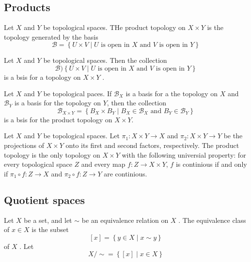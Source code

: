 \documentclass{article}
\theoremstyle{remark}
\begin{document}
\subsection{Products}%
\label{sub:products}

\begin{definition}
    Let $X$  and $Y $  be topological spaces. THe product topology on $X \times Y$  is the topology generated by the
    basis \[
        \mathscr{B}  = \left\{ U \times V  \mid  U \text{ is open in } X \text{ and } V \text{ is open in } Y  \right\}
    \]
\end{definition}

\begin{lemma}
    Let $X$ and $Y$  be topological spaces. Then the collection \[
        \mathscr{B }  ) \left\{ U \times  V  \mid  U \text{ is open in } X \text{ and } V \text{ is open in }Y \right\}
    \]
    is a bsis for a topology on $ X \times Y $ .
\end{lemma}


\begin{theorem}
 Let $X$  and $Y$  be topological paces. If $\mathscr{B} _{X}$  is a basis for a the topology on $X$  and $\mathscr{B}
 _{Y}$  is a basis for the topology on $Y$, then the collection \[
 \mathscr{B} _{X \times Y} = \left\{ B_{X} \times B_{Y}  \mid  B_{X} \in  \mathscr{B} _{X} \text{ and } B_{Y} \in
 \mathscr{B} _{Y} \right\}
 \]
 is a bsis for the product topology on $X  \times  Y$.
\end{theorem}


\begin{theorem}
    Let $X$  and $Y$ be topological spaces. Let $\pi _{1}: X \times Y \to X$  and $\pi _{2} : X \times Y \to Y$ be the
    projections of $X \times Y$  onto its first and second factors, respectively. The product topology is the only
    topology on $X \times  Y$ with  the following universial property: for every topological space $Z$  and every map
    $f: Z  \to X \times Y$, $f $  is continious if and only if $\pi _{1} \circ f : Z \to X $ and $\pi _{2} \circ f: Z
    \to Y$ are continious.
\end{theorem}


\subsection{Quotient spaces}%
\label{sub:quotient_spaces}

\begin{definition}
    Let $X$  be a set, and let $\sim $  be an equivalence relation on $X$ . The equivalence class of $x \in X$  is the
    subset \[
        \left[ x \right]= \left\{ y \in  X   \mid  x \sim y\right\}
    \]
    of $X$ . Let \[
        X / \sim = \left\{ \left[ x \right]  \mid  x \in  X \right\}
    \]

\end{definition}
\end{document}
